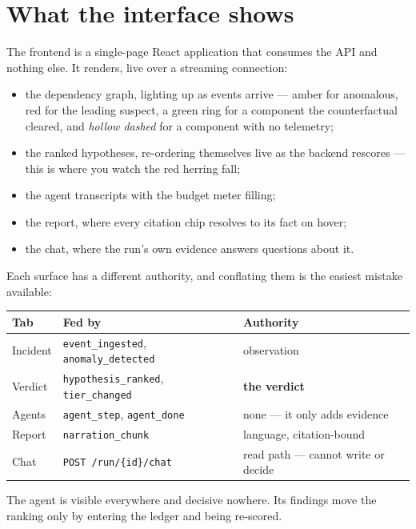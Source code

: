 \documentclass[11pt,a4paper]{article}
\newcommand{\code}[1]{\texttt{\small #1}}
\begin{document}
\section{What the interface shows}

The frontend is a single-page React application that consumes the API and
nothing else. It renders, live over a streaming connection:

\begin{itemize}[leftmargin=1.4em]
  \item the dependency graph, lighting up as events arrive --- amber for
  anomalous, red for the leading suspect, a green ring for a component the
  counterfactual cleared, and \emph{hollow dashed} for a component with no
  telemetry;
  \item the ranked hypotheses, re-ordering themselves live as the backend
  rescores --- this is where you watch the red herring fall;
  \item the agent transcripts with the budget meter filling;
  \item the report, where every citation chip resolves to its fact on hover;
  \item the chat, where the run's own evidence answers questions about it.
\end{itemize}

\noindent
Each surface has a different authority, and conflating them is the easiest
mistake available:

\begin{center}
\footnotesize
\begin{tabular}{@{}lll@{}}
\toprule
\textbf{Tab} & \textbf{Fed by} & \textbf{Authority} \\
\midrule
Incident & \code{event\_ingested}, \code{anomaly\_detected} & observation \\
Verdict  & \code{hypothesis\_ranked}, \code{tier\_changed}  & \textbf{the verdict} \\
Agents   & \code{agent\_step}, \code{agent\_done}           & none --- it only adds evidence \\
Report   & \code{narration\_chunk}                          & language, citation-bound \\
Chat     & \code{POST /run/\{id\}/chat}                     & read path --- cannot write or decide \\
\bottomrule
\end{tabular}
\end{center}

\noindent
The agent is visible everywhere and decisive nowhere. Its findings move the
ranking only by entering the ledger and being re-scored.
\end{document}
